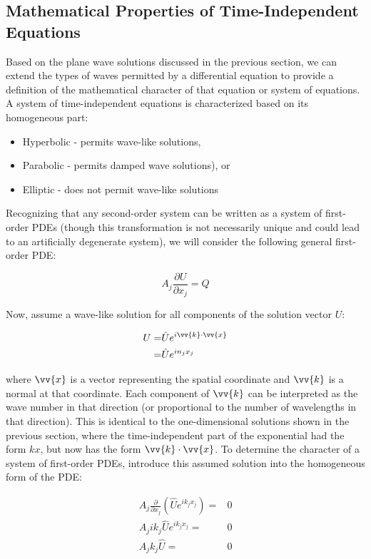 \documentclass[10pt]{article}
\newcommand{\beq}{\begin{equation}}
\newcommand{\eeq}{\end{equation}}
\newcommand{\beqa}{\begin{equation}\begin{aligned}}
\newcommand{\eeqa}{\end{aligned}\end{equation}}
\begin{document}
\begin{flushleft}
\subsection{Mathematical Properties of Time-Independent Equations}
Based on the plane wave solutions discussed in the previous section, we can extend the types of waves permitted by a differential equation to provide a definition of the mathematical character of that equation or system of equations. A system of time-independent equations is characterized based on its homogeneous part:

\begin{itemize}
\item Hyperbolic - permits wave-like solutions,
\item Parabolic - permits damped wave solutions), or
\item Elliptic - does not permit wave-like solutions
\end{itemize}

Recognizing that any second-order system can be written as a system of first-order PDEs (though this transformation is not necessarily unique and could lead to an artificially degenerate system), we will consider the following general first-order PDE:

\beq
\label{eq:SteadyStateEqn}
A_j\frac{\partial U}{\partial x_j}=Q
\eeq

Now, assume a wave-like solution for all components of the solution vector \(U\):

\beqa
\label{eq:WaveSolution}
U=&\hat{U}e^{i\vv{k}\cdot\vv{x}}\\
=&\hat{U}e^{in_jx_j}\\
\eeqa

where \(\vv{x}\) is a vector representing the spatial coordinate and \(\vv{k}\) is a normal at that coordinate. Each component of \(\vv{k}\) can be interpreted as the wave number in that direction (or proportional to the number of wavelengths in that direction). This is identical to the one-dimensional solutions shown in the previous section, where the time-independent part of the exponential had the form \(kx\), but now has the form \(\vv{k}\cdot\vv{x}\). To determine the character of a system of first-order PDEs, introduce this assumed solution into the homogeneous form of the PDE:

\beqa
\label{eq:Condition}
A_j\frac{\partial}{\partial x_j}\left(\hat{U}e^{ik_jx_j}\right)=&0\\
A_jik_j\hat{U}e^{ik_jx_j}=&0\\
A_jk_j\hat{U}=&0\\
\eeqa


\end{flushleft}
\end{document}
